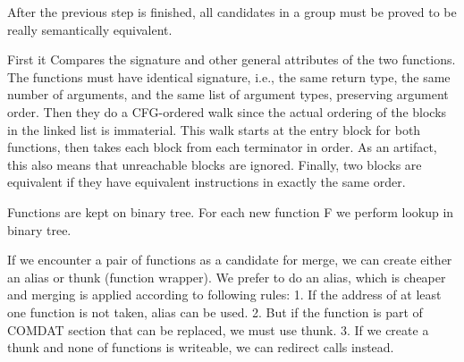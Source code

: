 After the previous step is finished, all candidates in a group must be proved to
be really semantically equivalent.

First it Compares the signature and other general attributes of the two functions.
The functions must have identical signature, i.e., the same return type, the same
number of arguments, and the same list of argument types, preserving argument order.
Then they do a CFG-ordered walk since the actual ordering of the blocks in the
linked list is immaterial. This walk starts at the entry block for both
functions, then takes each block from each terminator in order. As an
artifact, this also means that unreachable blocks are ignored.
Finally, two blocks are equivalent if they have equivalent instructions in
exactly the same order.

Functions are kept on binary tree. For each new function F we perform
lookup in binary tree.



If we encounter a pair of functions as a candidate for merge, we can create either
an alias or thunk (function wrapper). We prefer to do an alias, which is cheaper
and merging is applied according to following rules:
1. If the address of at least one function is not taken, alias can be used.
2. But if the function is part of COMDAT section that can be replaced, we
must use thunk.
3. If we create a thunk and none of functions is writeable, we can redirect calls
instead.

